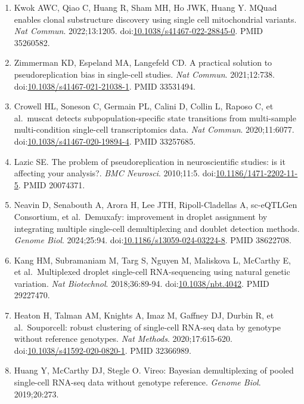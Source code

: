 \documentclass{article}
\begin{document}
\begin{enumerate}
  PMID 38253266.
\item
  Kwok AWC, Qiao C, Huang R, Sham MH, Ho JWK, Huang Y. MQuad enables
  clonal substructure discovery using single cell mitochondrial
  variants. \emph{Nat Commun}. 2022;13:1205.
  doi:\href{https://doi.org/10.1038/s41467-022-28845-0}{10.1038/s41467-022-28845-0}.
  PMID 35260582.
\item
  Zimmerman KD, Espeland MA, Langefeld CD. A practical solution to
  pseudoreplication bias in single-cell studies. \emph{Nat Commun}.
  2021;12:738.
  doi:\href{https://doi.org/10.1038/s41467-021-21038-1}{10.1038/s41467-021-21038-1}.
  PMID 33531494.
\item
  Crowell HL, Soneson C, Germain PL, Calini D, Collin L, Raposo C, et
  al.~muscat detects subpopulation-specific state transitions from
  multi-sample multi-condition single-cell transcriptomics data.
  \emph{Nat Commun}. 2020;11:6077.
  doi:\href{https://doi.org/10.1038/s41467-020-19894-4}{10.1038/s41467-020-19894-4}.
  PMID 33257685.
\item
  Lazic SE. The problem of pseudoreplication in neuroscientific studies:
  is it affecting your analysis?. \emph{BMC Neurosci}. 2010;11:5.
  doi:\href{https://doi.org/10.1186/1471-2202-11-5}{10.1186/1471-2202-11-5}.
  PMID 20074371.
\item
  Neavin D, Senabouth A, Arora H, Lee JTH, Ripoll-Cladellas A,
  sc-eQTLGen Consortium, et al.~Demuxafy: improvement in droplet
  assignment by integrating multiple single-cell demultiplexing and
  doublet detection methods. \emph{Genome Biol}. 2024;25:94.
  doi:\href{https://doi.org/10.1186/s13059-024-03224-8}{10.1186/s13059-024-03224-8}.
  PMID 38622708.
\item
  Kang HM, Subramaniam M, Targ S, Nguyen M, Maliskova L, McCarthy E, et
  al.~Multiplexed droplet single-cell RNA-sequencing using natural
  genetic variation. \emph{Nat Biotechnol}. 2018;36:89-94.
  doi:\href{https://doi.org/10.1038/nbt.4042}{10.1038/nbt.4042}. PMID
  29227470.
\item
  Heaton H, Talman AM, Knights A, Imaz M, Gaffney DJ, Durbin R, et
  al.~Souporcell: robust clustering of single-cell RNA-seq data by
  genotype without reference genotypes. \emph{Nat Methods}.
  2020;17:615-620.
  doi:\href{https://doi.org/10.1038/s41592-020-0820-1}{10.1038/s41592-020-0820-1}.
  PMID 32366989.
\item
  Huang Y, McCarthy DJ, Stegle O. Vireo: Bayesian demultiplexing of
  pooled single-cell RNA-seq data without genotype reference.
  \emph{Genome Biol}. 2019;20:273.

\end{enumerate}
\end{document}
